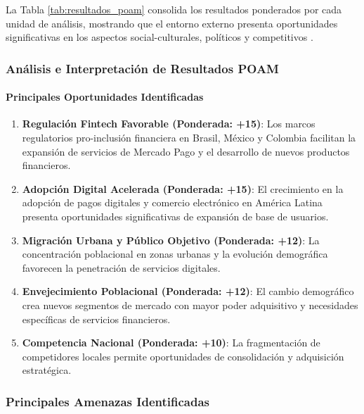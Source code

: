 La Tabla \ref{tab:resultados_poam} consolida los resultados ponderados por cada unidad de análisis, mostrando que el entorno externo presenta oportunidades significativas en los aspectos social-culturales, políticos y competitivos \autocite{porter1985}.

\subsubsection{Análisis e Interpretación de Resultados POAM}

\paragraph{Principales Oportunidades Identificadas}

\begin{enumerate}
\item \textbf{Regulación Fintech Favorable (Ponderada: +15)}: Los marcos regulatorios pro-inclusión financiera en Brasil, México y Colombia facilitan la expansión de servicios de Mercado Pago y el desarrollo de nuevos productos financieros.

\item \textbf{Adopción Digital Acelerada (Ponderada: +15)}: El crecimiento en la adopción de pagos digitales y comercio electrónico en América Latina presenta oportunidades significativas de expansión de base de usuarios.

\item \textbf{Migración Urbana y Público Objetivo (Ponderada: +12)}: La concentración poblacional en zonas urbanas y la evolución demográfica favorecen la penetración de servicios digitales.

\item \textbf{Envejecimiento Poblacional (Ponderada: +12)}: El cambio demográfico crea nuevos segmentos de mercado con mayor poder adquisitivo y necesidades específicas de servicios financieros.

\item \textbf{Competencia Nacional (Ponderada: +10)}: La fragmentación de competidores locales permite oportunidades de consolidación y adquisición estratégica.
\end{enumerate}

\subsubsection{Principales Amenazas Identificadas}

